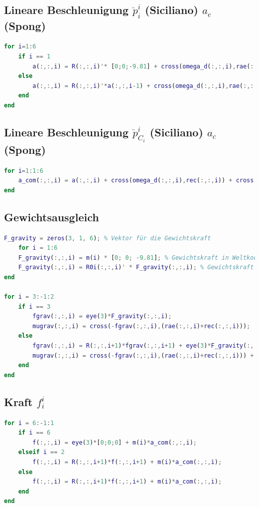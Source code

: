 \subsection{Lineare Beschleunigung $\ddot p^{i}_i$ (Siciliano) $a_e$ (Spong)}
%
\begin{lstlisting}[language=Matlab, numbers=none]
for i=1:6
	if i == 1
		a(:,:,i) = R(:,:,i)'* [0;0;-9.81] + cross(omega_d(:,:,i),rae(:,:,i)) + cross(omega(:,:,i),(cross(omega(:,:,i), rae(:,:,i))));
	else
		a(:,:,i) = R(:,:,i)'*a(:,:,i-1) + cross(omega_d(:,:,i),rae(:,:,i)) + cross(omega(:,:,i),(cross(omega(:,:,i), rae(:,:,i))));
	end
end
\end{lstlisting}
%
\subsection{Lineare Beschleunigung $\ddot p^{i}_{C_i}$ (Siciliano) $a_c$ (Spong)}
%
\begin{lstlisting}[language=Matlab, numbers=none]
for i=1:1:6
	a_com(:,:,i) = a(:,:,i) + cross(omega_d(:,:,i),rec(:,:,i)) + cross(omega(:,:,i),(cross(omega(:,:,i), rec(:,:,i))));
end
\end{lstlisting}
%
\subsection{Gewichtsausgleich}
%
\begin{lstlisting}[language=Matlab, numbers=none]
F_gravity = zeros(3, 1, 6); % Vektor für die Gewichtskraft
	for i = 1:6
	F_gravity(:,:,i) = m(i) * [0; 0; -9.81]; % Gewichtskraft in Weltkoordinaten
	F_gravity(:,:,i) = R0i(:,:,i)' * F_gravity(:,:,i); % Gewichtskraft ins Körpersystem transformieren
end

for i = 3:-1:2
	if i == 3
		fgrav(:,:,i) = eye(3)*F_gravity(:,:,i);
		mugrav(:,:,i) = cross(-fgrav(:,:,i),(rae(:,:,i)+rec(:,:,i)));
	else
		fgrav(:,:,i) = R(:,:,i+1)*fgrav(:,:,i+1) + eye(3)*F_gravity(:,:,i);
		mugrav(:,:,i) = cross(-fgrav(:,:,i),(rae(:,:,i)+rec(:,:,i))) + R(:,:,i+1)*mugrav(:,:,i+1) + R(:,:,i+1)*cross(fgrav(:,:,i+1), rec(:,:,i));
	end
end
\end{lstlisting}
%
\subsection{Kraft $f^{i}_i$}
%
\begin{lstlisting}[language=Matlab, numbers=none]
for i = 6:-1:1
	if i == 6
		f(:,:,i) = eye(3)*[0;0;0] + m(i)*a_com(:,:,i);
	elseif i == 2
		f(:,:,i) = R(:,:,i+1)*f(:,:,i+1) + m(i)*a_com(:,:,i);
	else
		f(:,:,i) = R(:,:,i+1)*f(:,:,i+1) + m(i)*a_com(:,:,i);
	end
end
\end{lstlisting}
%
